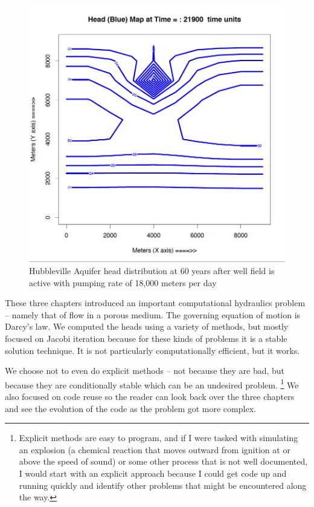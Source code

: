 \begin{figure}[h!] %
   \centering
   \includegraphics[width=6in]{./18-UnsteadyGroundwaterFlow/HubblevillePlot60PostDev.jpg} 
   \caption{Hubbleville Aquifer head distribution at 60 years after well field is active with pumping rate of 18,000 meters per day}
   \label{fig:HubblevillePlot60PostDev}
\end{figure}

These three chapters introduced an important computational hydraulics problem -- namely that of flow in a porous medium. 
The governing equation of motion is Darcy's law.  
We computed the heads using a variety of methods, but mostly focused on Jacobi iteration because for these kinds of problems it is a stable solution technique.  
It is not particularly computationally efficient, but it works. 

We choose not to even do explicit methods -- not because they are bad, but because they are conditionally stable which can be an undesired problem.  
\footnote{Explicit methods are easy to program, and if I were tasked with simulating an explosion (a chemical reaction that moves outward from ignition at or above the speed of sound) or some other process that is not well documented, I would start with an explicit approach because I could get code up and running quickly and identify other problems that might be encountered along the way.}
We also focused on code reuse so the reader can look back over the three chapters and see the evolution of the code as the problem got more complex.

